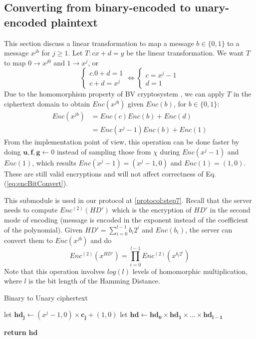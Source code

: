 \subsection{Converting from binary-encoded to unary-encoded plaintext}
\label{sec:binToUna}
This section discuss a linear transformation to map a message $b \in \{0,1\}$
to a message $x^{jb}$ for $j \geq 1$. Let $T: cx + d = y$ be the linear transformation. We want $T$ to map $0 \rightarrow x^{j0} $ and
$1 \rightarrow x^j$, or
\[
  \begin{cases}
    c.0 + d = 1\\
    c + d = x^j
  \end{cases}
  \Leftrightarrow
  \begin{cases}
    c = x^j - 1\\
    d = 1
  \end{cases}
\]
Due to the homomorphism property of BV cryptosystem , we can apply
$T$ in the ciphertext domain to obtain $Enc(x^{jb})$ given $Enc(b)$,
for $b \in \{0,1\}$:
\begin{align}
  \label{eq:encBitConvert}
  Enc(x^{jb}) &= Enc(c)Enc(b) + Enc(d) \nonumber \\
              &= Enc(x^j - 1)Enc(b) + Enc(1)
\end{align}
From the implementation point of view, this operation can be done faster
by doing $\mathbf{u}, \mathbf{f}, \mathbf{g} \gets 0$ instead of sampling those from
$\chi$ during $Enc(x^j -1)$ and $Enc(1)$, which results $Enc(x^j -1) = (x^j - 1, 0)$ and $Enc(1) = (1,0)$. These are still valid encryptions and will not affect correctness of Eq. (\ref{eq:encBitConvert}).

This submodule is used in our protocol at \ref{protocol:step7}. Recall that the server needs
to compute $Enc^{(2)}(HD')$ which is the encryption of $HD'$ in the second mode
of encoding (message is encoded in the exponent instead of the coefficient of the
polynomial). Given $HD' = \sum_{i=0}^{l-1}b_i2^i$ and $Enc(b_i)$, the server can convert them to $Enc(x^{jb})$ and do
\[
  Enc^{(2)}(x^{HD'}) = \prod_{i=0}^{l-1}Enc^{(2)}(x^{b_i2^i})
\]
Note that this operation involves $log(l)$ levels of homomorphic multiplication, where
$l$ is the bit length of the Hamming Distance.
\begin{algorithm}
  \caption{Binary to Unary ciphertext}\label{alg:ToUnary}
  \begin{algorithmic}[1]
    \State let $\mathbf{hd_j} \gets (x^j - 1,0)\times \mathbf{c_j} + (1,0)$
    \EndFor
    \State let $\mathbf{hd} \gets \mathbf{hd_0} \times \mathbf{hd_1} \times \dots
    \times \mathbf{hd_{l-1}}$


    \State \textbf{return} $\mathbf{hd}$
    \EndProcedure
  \end{algorithmic}
\end{algorithm}

